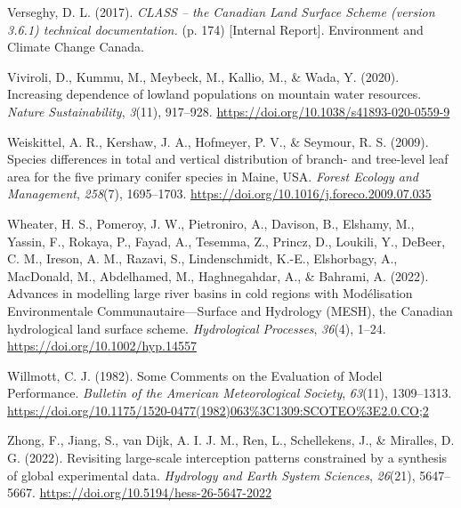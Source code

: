 \documentclass[
]{agujournal2019}
\newlength{\cslhangindent}
\newenvironment{CSLReferences}[2] %
 {\begin{list}{}{%
  \setlength{\itemindent}{0pt}
  \setlength{\leftmargin}{0pt}
  \setlength{\parsep}{0pt}
  \ifodd #1
   \setlength{\leftmargin}{\cslhangindent}
   \setlength{\itemindent}{-1\cslhangindent}
  \fi
  \setlength{\itemsep}{#2\baselineskip}}}
 {\end{list}}
\begin{document}
\begin{CSLReferences}{1}{0}
Verseghy, D. L. (2017). \emph{{CLASS} -- the {Canadian Land Surface
Scheme} (version 3.6.1) technical documentation.} (p. 174) {[}Internal
Report{]}. {Environment and Climate Change Canada}.

Viviroli, D., Kummu, M., Meybeck, M., Kallio, M., \& Wada, Y. (2020).
Increasing dependence of lowland populations on mountain water
resources. \emph{Nature Sustainability}, \emph{3}(11), 917--928.
\url{https://doi.org/10.1038/s41893-020-0559-9}

Weiskittel, A. R., Kershaw, J. A., Hofmeyer, P. V., \& Seymour, R. S.
(2009). Species differences in total and vertical distribution of
branch- and tree-level leaf area for the five primary conifer species in
{Maine}, {USA}. \emph{Forest Ecology and Management}, \emph{258}(7),
1695--1703. \url{https://doi.org/10.1016/j.foreco.2009.07.035}

Wheater, H. S., Pomeroy, J. W., Pietroniro, A., Davison, B., Elshamy,
M., Yassin, F., Rokaya, P., Fayad, A., Tesemma, Z., Princz, D., Loukili,
Y., DeBeer, C. M., Ireson, A. M., Razavi, S., Lindenschmidt, K.-E.,
Elshorbagy, A., MacDonald, M., Abdelhamed, M., Haghnegahdar, A., \&
Bahrami, A. (2022). Advances in modelling large river basins in cold
regions with {Modélisation Environmentale Communautaire}---{Surface} and
{Hydrology} ({MESH}), the {Canadian} hydrological land surface scheme.
\emph{Hydrological Processes}, \emph{36}(4), 1--24.
\url{https://doi.org/10.1002/hyp.14557}

Willmott, C. J. (1982). Some {Comments} on the {Evaluation} of {Model
Performance}. \emph{Bulletin of the American Meteorological Society},
\emph{63}(11), 1309--1313.
\url{https://doi.org/10.1175/1520-0477(1982)063\%3C1309:SCOTEO\%3E2.0.CO;2}

Zhong, F., Jiang, S., van Dijk, A. I. J. M., Ren, L., Schellekens, J.,
\& Miralles, D. G. (2022). Revisiting large-scale interception patterns
constrained by a synthesis of global experimental data. \emph{Hydrology
and Earth System Sciences}, \emph{26}(21), 5647--5667.
\url{https://doi.org/10.5194/hess-26-5647-2022}

\end{CSLReferences}
\end{document}
